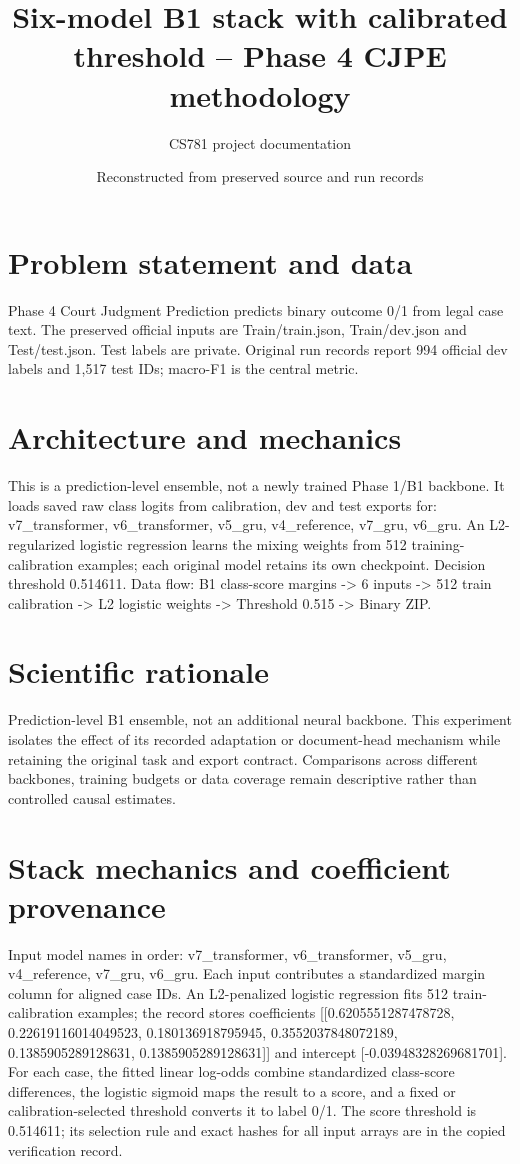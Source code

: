 \documentclass[11pt,a4paper]{article}
\begin{document}
\title{Six-model B1 stack with calibrated threshold -- Phase 4 CJPE methodology}
\author{CS781 project documentation}
\date{Reconstructed from preserved source and run records}
\maketitle
\section{Problem statement and data}
Phase 4 Court Judgment Prediction predicts binary outcome 0/1 from legal case text. The preserved official inputs are Train/train.json, Train/dev.json and Test/test.json. Test labels are private. Original run records report 994 official dev labels and 1,517 test IDs; macro-F1 is the central metric.
\section{Architecture and mechanics}
This is a prediction-level ensemble, not a newly trained Phase 1/B1 backbone. It loads saved raw class logits from calibration, dev and test exports for: v7\_transformer, v6\_transformer, v5\_gru, v4\_reference, v7\_gru, v6\_gru. An L2-regularized logistic regression learns the mixing weights from 512 training-calibration examples; each original model retains its own checkpoint. Decision threshold 0.514611. Data flow: B1 class-score margins -> 6 inputs -> 512 train calibration -> L2 logistic weights -> Threshold 0.515 -> Binary ZIP.
\section{Scientific rationale}
Prediction-level B1 ensemble, not an additional neural backbone. This experiment isolates the effect of its recorded adaptation or document-head mechanism while retaining the original task and export contract. Comparisons across different backbones, training budgets or data coverage remain descriptive rather than controlled causal estimates.
\section{Stack mechanics and coefficient provenance}
Input model names in order: v7\_transformer, v6\_transformer, v5\_gru, v4\_reference, v7\_gru, v6\_gru. Each input contributes a standardized margin column for aligned case IDs. An L2-penalized logistic regression fits 512 train-calibration examples; the record stores coefficients [[0.6205551287478728, 0.22619116014049523, 0.180136918795945, 0.3552037848072189, 0.1385905289128631, 0.1385905289128631]] and intercept [-0.03948328269681701]. For each case, the fitted linear log-odds combine standardized class-score differences, the logistic sigmoid maps the result to a score, and a fixed or calibration-selected threshold converts it to label 0/1. The score threshold is 0.514611; its selection rule and exact hashes for all input arrays are in the copied verification record.
\end{document}
